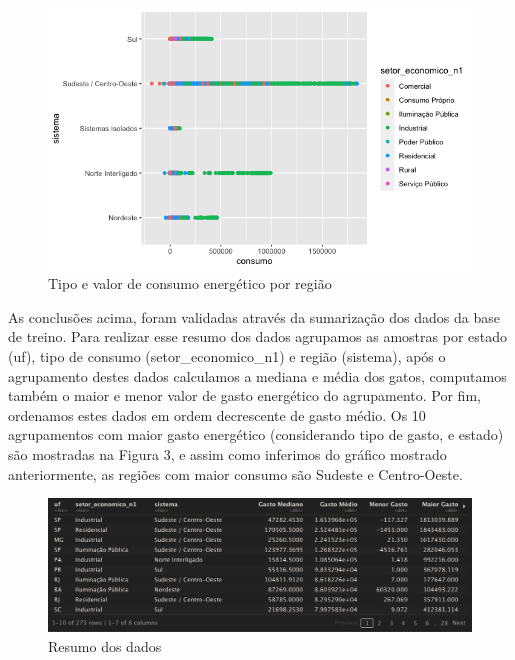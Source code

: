 \documentclass[12pt]{article}
\begin{document}
\begin{figure}[!h]
\centering
\includegraphics[width=1.2\textwidth]{images/consumo_sistema_tipoConsumo.png}
\caption{Tipo e valor de consumo energético por região}
\label{fig:exampleFig1}
\end{figure}


As conclusões acima, foram validadas através da sumarização dos dados da base de treino. Para realizar esse resumo dos dados agrupamos as amostras por estado (uf), tipo de consumo (setor\_economico\_n1) e região (sistema), após o agrupamento destes dados calculamos a mediana e média dos gatos, computamos também o maior e menor valor de gasto energético do agrupamento. Por fim, ordenamos estes dados em ordem decrescente de gasto médio. Os 10 agrupamentos com maior gasto energético (considerando tipo de gasto, e estado) são mostradas na Figura 3, e assim como inferimos do gráfico mostrado anteriormente, as regiões com maior consumo são Sudeste e Centro-Oeste.
\begin{figure}[!h]
\centering
\includegraphics[width=1\textwidth]{images/summarise_treino.png}
\caption{Resumo dos dados}
\label{fig:exampleFig1}
\end{figure}
\end{document}
